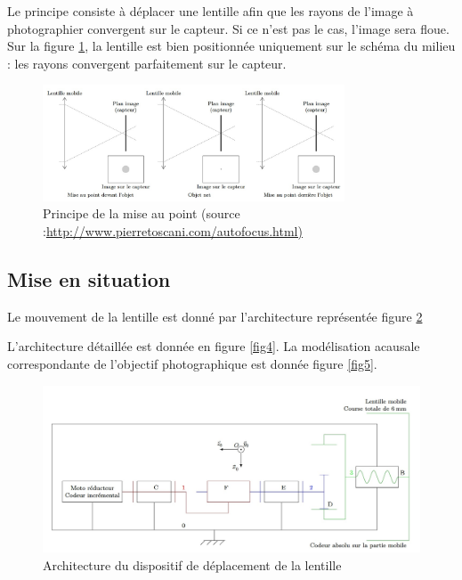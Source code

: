 Le principe consiste à déplacer une lentille afin que les rayons de l'image à photographier convergent sur le capteur. Si ce n'est pas le
cas, l'image sera floue. Sur la figure \ref{fig2}, la lentille est bien positionnée uniquement sur le schéma du milieu :
les rayons convergent parfaitement sur le capteur.


\begin{figure}[!htb]
\begin{center}
\includegraphics[width=0.8\textwidth]{images/image_fig2.jpg}
\caption{Principe de la mise au point (source :\url{http://www.pierretoscani.com/autofocus.html)} \label{fig2}}
\end{center}
\end{figure}
\fi


\subsection{Mise en situation}\label{mise-en-situation}
\ifprof
\else

Le mouvement de la lentille est donné par l'architecture représentée
figure \ref{fig3}

L'architecture détaillée est donnée en figure \ref{fig4}. La modélisation acausale
correspondante de l'objectif photographique est donnée figure \ref{fig5}.

\begin{figure}[!htb]
\begin{center}
\includegraphics[width=1.0\textwidth]{images/image_fig3.jpg}
\caption{Architecture du dispositif de déplacement de la lentille \label{fig3}}
\end{center}
\end{figure}

